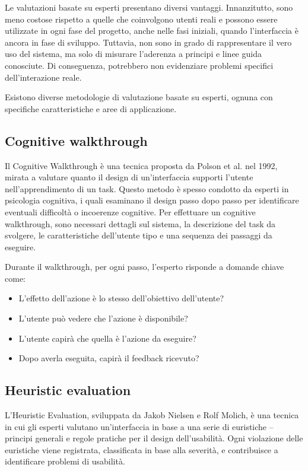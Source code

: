 Le valutazioni basate su esperti presentano diversi vantaggi. Innanzitutto, sono meno costose rispetto a quelle che coinvolgono utenti reali e possono essere utilizzate in ogni fase del progetto, anche nelle fasi iniziali, quando l’interfaccia è ancora in fase di sviluppo. Tuttavia, non sono in grado di rappresentare il vero uso del sistema, ma solo di misurare l'aderenza a principi e linee guida conosciute. Di conseguenza, potrebbero non evidenziare problemi specifici dell’interazione reale.

Esistono diverse metodologie di valutazione basate su esperti, ognuna con specifiche caratteristiche e aree di applicazione.

\subsection{Cognitive walkthrough}
Il Cognitive Walkthrough è una tecnica proposta da Polson et al. nel 1992, mirata a valutare quanto il design di un'interfaccia supporti l'utente nell'apprendimento di un task. Questo metodo è spesso condotto da esperti in psicologia cognitiva, i quali esaminano il design passo dopo passo per identificare eventuali difficoltà o incoerenze cognitive. Per effettuare un cognitive walkthrough, sono necessari dettagli sul sistema, la descrizione del task da svolgere, le caratteristiche dell'utente tipo e una sequenza dei passaggi da eseguire.

Durante il walkthrough, per ogni passo, l’esperto risponde a domande chiave come:
\begin{itemize}
    \item L'effetto dell'azione è lo stesso dell'obiettivo dell'utente?
    \item L'utente può vedere che l'azione è disponibile?
    \item L'utente capirà che quella è l'azione da eseguire?
    \item Dopo averla eseguita, capirà il feedback ricevuto?
\end{itemize}

\subsection{Heuristic evaluation}
L'Heuristic Evaluation, sviluppata da Jakob Nielsen e Rolf Molich, è una tecnica in cui gli esperti valutano un’interfaccia in base a una serie di euristiche – principi generali e regole pratiche per il design dell’usabilità. Ogni violazione delle euristiche viene registrata, classificata in base alla severità, e contribuisce a identificare problemi di usabilità.

